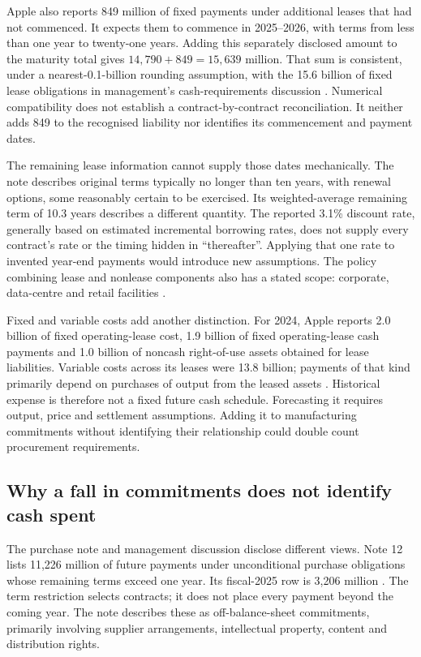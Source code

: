 Apple also reports 849 million of fixed payments under additional leases that
had not commenced. It expects them to commence in 2025--2026, with terms from
less than one year to twenty-one years. Adding this separately disclosed amount
to the maturity total gives $14{,}790+849=15{,}639$ million. That sum is
consistent, under a nearest-0.1-billion rounding assumption, with the 15.6
billion of fixed lease obligations in management's cash-requirements discussion
\citep[printed pp.~25 and 42]{apple2024}. Numerical compatibility does not
establish a contract-by-contract reconciliation. It neither adds 849 to the
recognised liability nor identifies its commencement and payment dates.

The remaining lease information cannot supply those dates mechanically. The
note describes original terms typically no longer than ten years, with renewal
options, some reasonably certain to be exercised. Its weighted-average
remaining term of 10.3 years describes a different quantity. The reported
3.1\% discount rate, generally based on estimated incremental borrowing rates,
does not supply every contract's rate or the timing hidden in ``thereafter''.
Applying that one rate to invented year-end payments would introduce new
assumptions. The policy combining lease and nonlease components also has a
stated scope: corporate, data-centre and retail facilities
\citep[Notes 1 and 8, printed pp.~34 and 42]{apple2024}.

Fixed and variable costs add another distinction. For 2024, Apple reports
2.0 billion of fixed operating-lease cost, 1.9 billion of fixed operating-lease
cash payments and 1.0 billion of noncash right-of-use assets obtained for lease
liabilities. Variable costs across its leases were 13.8 billion; payments of
that kind primarily depend on purchases of output from the leased assets
\citep[Note 8, printed p.~42]{apple2024}. Historical expense is therefore not a
fixed future cash schedule. Forecasting it requires output, price and settlement
assumptions. Adding it to manufacturing commitments without identifying their
relationship could double count procurement requirements.

\subsection{Why a fall in commitments does not identify cash spent}

The purchase note and management discussion disclose different views. Note 12
lists 11,226 million of future payments under unconditional purchase obligations
whose remaining terms exceed one year. Its fiscal-2025 row is 3,206 million
\citep[Note 12, printed p.~45]{apple2024}. The term restriction selects
contracts; it does not place every payment beyond the coming year. The note
describes these as off-balance-sheet commitments, primarily involving supplier
arrangements, intellectual property, content and distribution rights.

